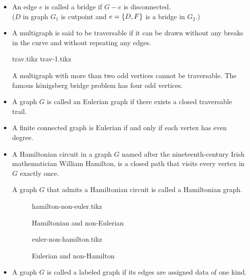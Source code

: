\documentclass[../main-sheet.tex]{subfiles}
\begin{document}
\begin{itemize}
    \item An edge $ e $ is called a bridge if $ G-e $ is disconnected.\\($ D $ in graph $ G_1 $ is cutpoint and $ e=\left\{D,F\right\} $ is a bridge in $ G_2 $.)
    \item  A multigraph is said to be traversable if it can be drawn without any breaks in the curve and without repeating any edges.\\
    \begin{center}
        {trav.tikz}
        \quad
        {trav-1.tikz}
    \end{center}
    A multigraph with more than two odd vertices cannot be traversable. The famous k\"onigsberg bridge problem has four odd vertices.
    \item A graph $ G $ is called an Eulerian graph if there exists a closed traversable trail.
    \item A finite connected graph is Eulerian if and only if each vertex has even degree.
    \item A Hamiltonian circuit in a graph $ G $ named after the nineteenth-century Irish mathematician William Hamilton, is a closed path that visits every vertex in $ G $ exactly once.
    
    A graph $ G $ that admits a Hamiltonian circuit is called a Hamiltonian graph.
    \begin{figure}[h]
        \centering
        \begin{minipage}[b]{0.4\textwidth}
           \centering
            {hamilton-non-euler.tikz}
            \caption{Hamiltonian and non-Eulerian}
            \label{fig:hamilNonEuler}
        \end{minipage}
        \begin{minipage}[b]{0.5\textwidth}
        \centering
            {euler-non-hamilton.tikz}
            \caption{Eulerian and non-Hamilton}
            \label{fig:eulerNonHamil}
        \end{minipage}
    \end{figure}
    \item A graph $ G $ is called a labeled graph if its edges are assigned data of one kind.
    

\end{itemize}
\end{document}
